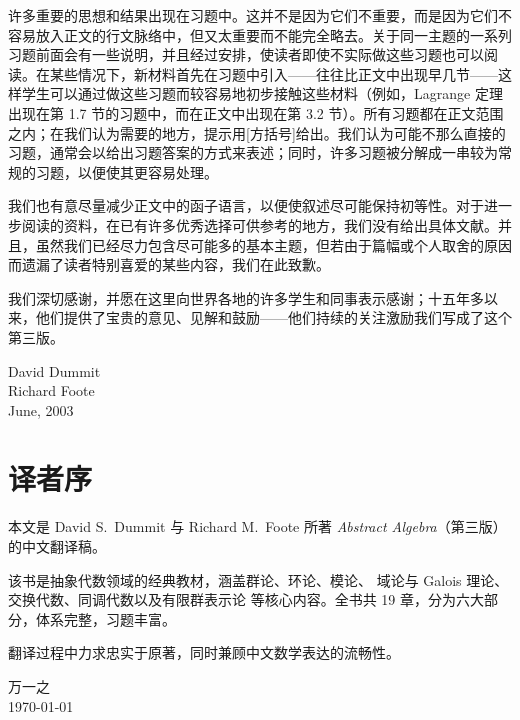 许多重要的思想和结果出现在习题中。这并不是因为它们不重要，而是因为它们不容易放入正文的行文脉络中，但又太重要而不能完全略去。关于同一主题的一系列习题前面会有一些说明，并且经过安排，使读者即使不实际做这些习题也可以阅读。在某些情况下，新材料首先在习题中引入——往往比正文中出现早几节——这样学生可以通过做这些习题而较容易地初步接触这些材料（例如，Lagrange 定理出现在第 1.7 节的习题中，而在正文中出现在第 3.2 节）。所有习题都在正文范围之内；在我们认为需要的地方，提示用[方括号]给出。我们认为可能不那么直接的习题，通常会以给出习题答案的方式来表述；同时，许多习题被分解成一串较为常规的习题，以便使其更容易处理。

我们也有意尽量减少正文中的函子语言，以便使叙述尽可能保持初等性。对于进一步阅读的资料，在已有许多优秀选择可供参考的地方，我们没有给出具体文献。并且，虽然我们已经尽力包含尽可能多的基本主题，但若由于篇幅或个人取舍的原因而遗漏了读者特别喜爱的某些内容，我们在此致歉。

我们深切感谢，并愿在这里向世界各地的许多学生和同事表示感谢；十五年多以来，他们提供了宝贵的意见、见解和鼓励——他们持续的关注激励我们写成了这个第三版。

\begin{flushright}
	David Dummit\\
	Richard Foote\\
	June, 2003
\end{flushright}
\chapter*{译者序}

本文是 David S.\ Dummit 与 Richard M.\ Foote 所著
\textit{Abstract Algebra}（第三版）的中文翻译稿。

该书是抽象代数领域的经典教材，涵盖群论、环论、模论、
域论与 Galois 理论、交换代数、同调代数以及有限群表示论
等核心内容。全书共 19 章，分为六大部分，体系完整，习题丰富。

翻译过程中力求忠实于原著，同时兼顾中文数学表达的流畅性。


\begin{flushright}
	万一之 \\
	\today
\end{flushright}